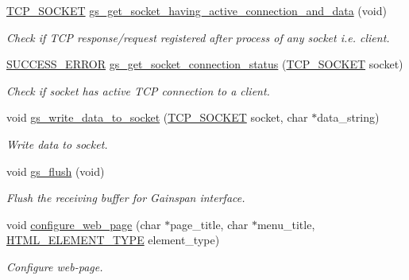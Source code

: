 \begin{DoxyCompactItemize}
\hyperlink{group__wireless__interface_gab2d7ad3f99c2b04b0f5f5a77eefc5355}{T\+C\+P\+\_\+\+S\+O\+C\+K\+ET} \hyperlink{group__wireless__interface_ga6daf26ca8217fba4d59bacb17ce81698}{gs\+\_\+get\+\_\+socket\+\_\+having\+\_\+active\+\_\+connection\+\_\+and\+\_\+data} (void)
\begin{DoxyCompactList}\small\item\em Check if T\+CP response/request registered after process of any socket i.\+e. client. \end{DoxyCompactList}\item 
\hyperlink{group__wireless__interface_ga2e53871073b531f122f463441c113633}{S\+U\+C\+C\+E\+S\+S\+\_\+\+E\+R\+R\+OR} \hyperlink{group__wireless__interface_ga833f4a56971310092186e8973687d1c9}{gs\+\_\+get\+\_\+socket\+\_\+connection\+\_\+status} (\hyperlink{group__wireless__interface_gab2d7ad3f99c2b04b0f5f5a77eefc5355}{T\+C\+P\+\_\+\+S\+O\+C\+K\+ET} socket)
\begin{DoxyCompactList}\small\item\em Check if socket has active T\+CP connection to a client. \end{DoxyCompactList}\item 
void \hyperlink{group__wireless__interface_ga30139e0be00fb40524fcda595da58802}{gs\+\_\+write\+\_\+data\+\_\+to\+\_\+socket} (\hyperlink{group__wireless__interface_gab2d7ad3f99c2b04b0f5f5a77eefc5355}{T\+C\+P\+\_\+\+S\+O\+C\+K\+ET} socket, char $\ast$data\+\_\+string)
\begin{DoxyCompactList}\small\item\em Write data to socket. \end{DoxyCompactList}\item 
void \hyperlink{group__wireless__interface_ga69ea911394dd51594235998ab6433948}{gs\+\_\+flush} (void)
\begin{DoxyCompactList}\small\item\em Flush the receiving buffer for Gainspan interface. \end{DoxyCompactList}\item 
void \hyperlink{group__wireless__interface_ga5fffbf0efe019e42faef3e801c21af7d}{configure\+\_\+web\+\_\+page} (char $\ast$page\+\_\+title, char $\ast$menu\+\_\+title, \hyperlink{group__wireless__interface_ga2cc36b7c5f3111667d440d462542b02f}{H\+T\+M\+L\+\_\+\+E\+L\+E\+M\+E\+N\+T\+\_\+\+T\+Y\+PE} element\+\_\+type)
\begin{DoxyCompactList}\small\item\em Configure web-\/page. \end{DoxyCompactList}\item 

\end{DoxyCompactItemize}
